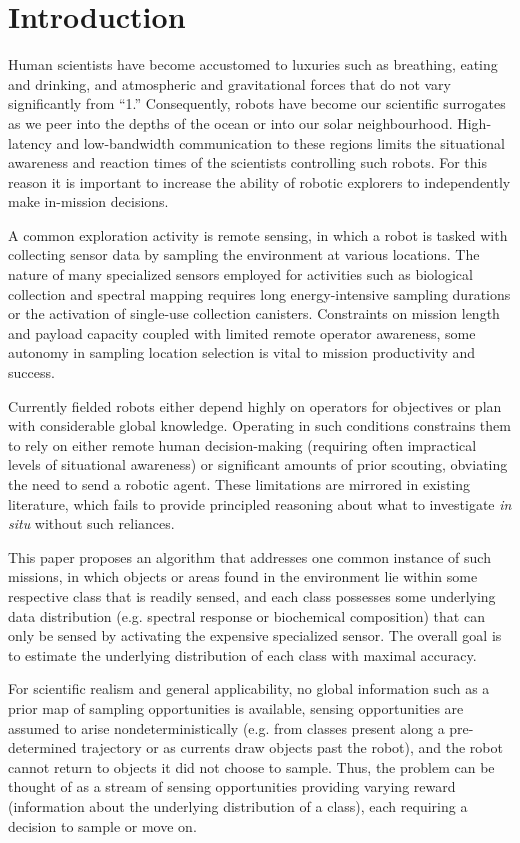 \section{Introduction}
\label{sec:intro}

Human scientists have become accustomed to luxuries such as breathing, eating
and drinking, and atmospheric and gravitational forces that do not
vary significantly from ``1.''  Consequently, robots have become our scientific
surrogates as we peer into the depths of the ocean or into our solar
neighbourhood.  High-latency and low-bandwidth communication to these regions limits the situational awareness and reaction times of the scientists controlling such robots.  For this reason it is important to increase the ability of robotic explorers to independently make in-mission decisions.

A common exploration activity is remote sensing, in which a robot is tasked with collecting sensor data by sampling the environment at various locations.  The nature of many specialized sensors employed for activities such as biological collection and spectral mapping requires long energy-intensive sampling durations or the activation of single-use collection canisters.  Constraints on mission length and payload capacity coupled with limited remote operator awareness, some autonomy in sampling location selection is vital to mission productivity and success.

Currently fielded robots either depend highly on operators for objectives or plan with considerable global knowledge.  Operating in such conditions constrains them to rely on either remote human decision-making (requiring often impractical levels of situational awareness) or significant amounts of prior scouting, obviating the need to send a robotic agent.  These limitations are mirrored in existing literature, which fails to provide principled reasoning about what to investigate \emph{in situ} without such reliances.

This paper proposes an algorithm that addresses one common instance of such missions, in which objects or areas found in the environment lie within some respective class that is readily sensed, and each class possesses some underlying data distribution (e.g. spectral response or biochemical composition) that can only be sensed by activating the expensive specialized sensor.  The overall goal is to estimate the underlying distribution of each class with maximal accuracy.

For scientific realism and general applicability, no global information such as a prior map of sampling opportunities is available, sensing opportunities are assumed to arise nondeterministically (e.g. from classes present along a pre-determined trajectory or as currents draw objects past the robot), and the robot cannot return to objects it did not choose to sample.  Thus, the problem can be thought of as a stream of sensing opportunities providing varying reward (information about the underlying distribution of a class), each requiring a decision to sample or move on.

